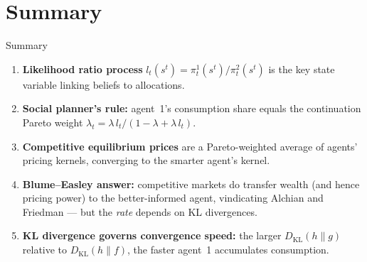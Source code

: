 \documentclass[aspectratio=169,12pt]{beamer}
\newcommand{\DKL}{D_{\mathrm{KL}}}
\begin{document}
\section{Summary}

\begin{frame}{Summary}

\begin{enumerate}
  \item \textbf{Likelihood ratio process} $l_t(s^t)=\pi_t^1(s^t)/\pi_t^2(s^t)$
        is the key state variable linking beliefs to allocations.

  \bigskip
  \item \textbf{Social planner's rule:} agent~1's consumption share equals
        the continuation Pareto weight
        $\lambda_t = \lambda\,l_t/(1-\lambda+\lambda\,l_t)$.

  \bigskip
  \item \textbf{Competitive equilibrium prices} are a Pareto-weighted average
        of agents' pricing kernels, converging to the smarter agent's kernel.

  \bigskip
  \item \textbf{Blume--Easley answer:} competitive markets do transfer wealth
        (and hence pricing power) to the better-informed agent, vindicating
        Alchian and Friedman --- but the \emph{rate} depends on KL divergences.

  \bigskip
  \item \textbf{KL divergence governs convergence speed:} the larger
        $\DKL(h\|g)$ relative to $\DKL(h\|f)$, the faster agent~1 accumulates
        consumption.
\end{enumerate}

\end{frame}
\end{document}
